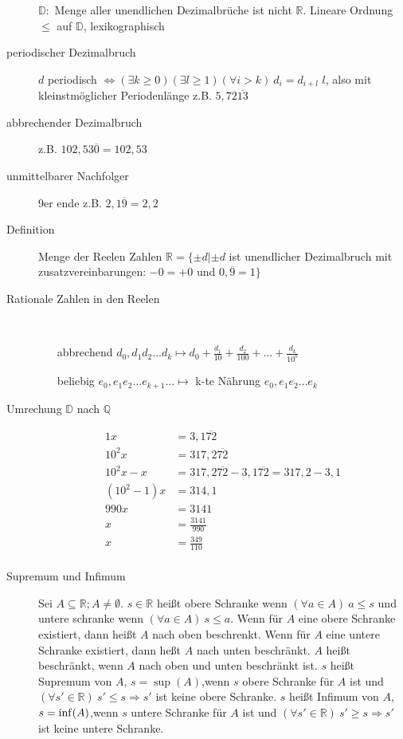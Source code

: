 \begin{description}
    $\mathbb{D} :$ Menge aller unendlichen Dezimalbrüche ist nicht $\mathbb{R}$. Lineare Ordnung $\leq$ auf $\mathbb{D}$, lexikographisch
    \item[periodischer Dezimalbruch] $d$ periodisch
    $\Leftrightarrow (\exists k \geq 0)(\exists l \geq 1) (\forall i > k)\ d_i= d_{i + l}$ $l$, also mit kleinstmöglicher Periodenlänge z.B. $5{,}72\overline{13}$
    \item[abbrechender Dezimalbruch] z.B. $102{,}53\overline{0} = 102{,}53$
    \item[unmittelbarer Nachfolger] 9er ende z.B. $2{,}1\overline{9} = 2{,}2$
    \item[Definition] Menge der Reelen Zahlen $\mathbb{R} = \lbrace \pm d | \pm d $ ist unendlicher Dezimalbruch mit zusatzvereinbarungen: $ -0 = +0 \textrm{ und } 0{,}\overline{9} = 1 \rbrace$
    \item[Rationale Zahlen in den Reelen] \
    \begin{itemize}
        \item[abbrechend] $d_0{,}d_1 d_2 \dots d_k \longmapsto d_0 + \frac{d_1}{10}+\frac{d_2}{100} + \dots + \frac{d_k}{10^k}$
        \item[beliebig] $e_0{,}e_1 e_2 \dots e_{k + 1} \dots \longmapsto$ k-te Nährung $e_0{,}e_1 e_2 \dots e_k$
    \end{itemize}
    \item[Umrechung $\mathbb{D}$ nach $\mathbb{Q}$]
    \begin{alignat*}{1}
        x         & = 3{,}1\overline{72}                                          \\
        10^2x     & = 317{,}2\overline{72}                                        \\
        10^2x-x   & = 317{,}2\overline{72} - 3{,}1\overline{72} = 317{,}2 - 3{,}1 \\
        (10^2-1)x & = 314{,}1                                                     \\
        990x      & = 3141                                                        \\
        x         & = \frac{3141}{990}                                            \\
        x         & = \frac{349}{110}                                             \\
    \end{alignat*}
    \item[Supremum und Infimum] Sei $A \subseteq \mathbb{R}; A \not = \emptyset$. $s \in \mathbb{R}$ heißt obere Schranke wenn $(\forall a \in A)\ a \leq s$ und untere schranke wenn $(\forall a \in A)\ s \leq a$. Wenn für $A$ eine obere Schranke existiert, dann heißt $A$ nach oben beschrenkt. Wenn für $A$ eine untere Schranke existiert, dann heßt $A$ nach unten beschränkt. $A$ heißt beschränkt, wenn $A$ nach oben und unten beschränkt ist. $s$ heißt Supremum von $A$, $s = \sup(A)$,wenn $s$ obere Schranke für $A$ ist und $(\forall s' \in \mathbb{R})\ s' \leq s \Rightarrow s'$ ist keine obere Schranke. $s$ heißt Infimum von $A$, $s = \operatorname{inf}(A)$,wenn $s$ untere Schranke für $A$ ist und $(\forall s' \in \mathbb{R})\ s' \geq s \Rightarrow s'$ ist keine untere Schranke.


\end{description}
